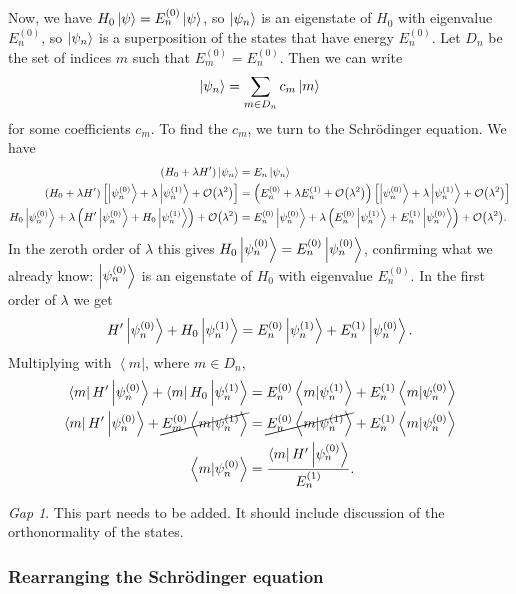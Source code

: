 \documentclass[11pt]{article}
\newcommand{\Od}[1]{\mathcal{O}{\left(#1\right)}}
\newcommand{\bra}[1]{\left\langle#1\right|}
\newcommand{\ket}[1]{\left|#1\right\rangle}
\newcommand{\braket}[2]{\left\langle#1|#2\right\rangle}
\theoremstyle{theorem}
\theoremstyle{remark}
\theoremstyle{step}
\theoremstyle{gap}
\newtheorem*{gap}{Gap}
\begin{document}
Now, we have \(H_0 \ks = E_n^{(0)} \ks\), so \(\ksn{n}\) is an eigenstate of \(H_0\) with eigenvalue \(E_n^{(0)}\), so \(\ksn{n}\) is a superposition of the states that have energy \(E_n^{(0)}\). Let \(D_n\) be the set of indices \(m\) such that \(E_m^{(0)} = E_n^{(0)}\). Then we can write
\[\ksn{n} = \sum_{m \in D_n} c_m \ket{m}\]
for some coefficients \(c_m\). To find the \(c_m\), we turn to the Schr\"odinger equation. We have
\begin{align*}
\left(H_0 + \lambda H^\prime\right) \ket{\psi_n} &= E_n \ket{\psi_n} \\
\left(H_0 + \lambda H^\prime\right) \left[\ksnp{n}{0} + \lambda \ksnp{n}{1} + \Od{\lambda^2}\right]
&= \left(E_n^{(0)} + \lambda E_n^{(1)} + \Od{\lambda^2}\right) \left[\ksnp{n}{0} + \lambda \ksnp{n}{1} + \Od{\lambda^2}\right] \\
H_0 \ksnp{n}{0} + \lambda \left(H^\prime \ksnp{n}{0} + H_0 \ksnp{n}{1}\right) + \Od{\lambda^2}
&= E_n^{(0)} \ksnp{n}{0} + \lambda \left(E_n^{(0)} \ksnp{n}{1} + E_n^{(1)} \ksnp{n}{0}\right) + \Od{\lambda^2}.
\end{align*}
In the zeroth order of \(\lambda\) this gives \(H_0 \ksnp{n}{0} = E_n^{(0)} \ksnp{n}{0}\), confirming what we already know: \(\ksnp{n}{0}\) is an eigenstate of \(H_0\) with eigenvalue \(E_n^{(0)}\). In the first order of \(\lambda\) we get
\[H^\prime \ksnp{n}{0} + H_0 \ksnp{n}{1} = E_n^{(0)} \ksnp{n}{1} + E_n^{(1)} \ksnp{n}{0}.\]
Multiplying with \(\bra{m}\), where \(m \in D_n\),
\begin{align*}
\bra{m} H^\prime \ksnp{n}{0} + \bra{m}H_0\ket{\psi_n^{(1)}} &= {E_n^{(0)} \braket{m}{\psi_n^{(1)}}} + E_n^{(1)} \braket{m}{\psi_n^{(0)}} \\
\bra{m} H^\prime \ksnp{n}{0} + \cancel{E_m^{(0)}\braket{m}{\psi_n^{(1)}}} &= \cancel{E_n^{(0)} \braket{m}{\psi_n^{(1)}}} + E_n^{(1)} \braket{m}{\psi_n^{(0)}} \\
\braket{m}{\psi_n^{(0)}} &= \frac{\bra{m} H^\prime \ksnp{n}{0}}{E_n^{(1)}}.
\end{align*}



\begin{gap}
This part needs to be added. It should include discussion of the orthonormality of the states.
\end{gap}

\subsubsection{Rearranging the Schr\"odinger equation}
\end{document}
